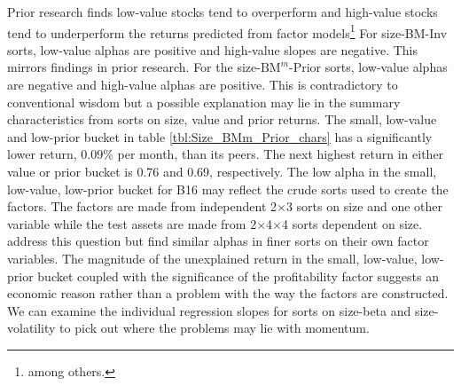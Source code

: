 Prior research finds low-value stocks tend to overperform and high-value stocks
tend to underperform the returns predicted from factor models\footnote{
\textcite{fama1992cross, fama1993common, loughran1997book, fama2006value} among
others.} For size-BM-Inv sorts, low-value alphas are positive and high-value
slopes are negative. This mirrors findings in prior research. For the
size-$\text{BM}^m$-Prior sorts, low-value alphas are negative and high-value
alphas are positive. This is contradictory to conventional wisdom but a
possible explanation may lie in the summary characteristics from sorts on size,
value and prior returns. The small, low-value and low-prior bucket in table
\ref{tbl:Size_BMm_Prior_chars} has a significantly lower return, 0.09\% per
month, than its peers. The next highest return in either value or prior bucket
is 0.76 and 0.69, respectively. The low alpha in the small, low-value,
low-prior bucket for B16 may reflect the crude sorts used to create the
factors.
The factors are made from independent 2$\times$3 sorts on size and one other
variable while the test assets are made from 2$\times$4$\times$4 sorts
dependent on size. \textcite{fama2015five} address this question but find
similar alphas in finer sorts on their own factor variables. The magnitude of
the unexplained return in the small, low-value, low-prior bucket coupled with
the significance of the profitability factor suggests an economic reason rather
than a problem with the way the factors are constructed. We can examine the
individual regression slopes for sorts on size-beta and size-volatility to pick
out where the problems may lie with momentum.

